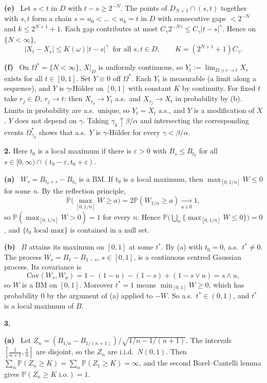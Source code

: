 \documentclass[11pt,a4paper]{article}
\renewcommand{\P}{\mathbb{P}}
\newcommand{\1}{\mathbf{1}}
\newcommand{\prob}[1]{\par\medskip\noindent\textbf{#1}\quad}
\newcommand{\sub}[1]{\par\smallskip\noindent\textbf{#1}\ }
\begin{document}
\sub{(e)} Let $s<t$ in $D$ with $t-s\ge2^{-N}$. The points of $D_{N+1}\cap(s,t)$ together with $s,t$
form a chain $s=u_0<\dots<u_k=t$ in $D$ with consecutive gaps $<2^{-N}$ and $k\le2^{N+1}+1$.
Each gap contributes at most $C_\gamma2^{-N\gamma}\le C_\gamma|t-s|^\gamma$. Hence on $\{N<\infty\}$,
\[|X_t-X_s|\le K(\omega)|t-s|^\gamma\ \text{ for all } s,t\in D,\qquad K=(2^{N+1}+1)C_\gamma.\]

\sub{(f)} On $\Omega^*=\{N<\infty\}$, $X|_D$ is uniformly continuous, so
$Y_t:=\lim_{D\ni r\to t}X_r$ exists for all $t\in[0,1]$. Set $Y\equiv0$ off $\Omega^*$. Each $Y_t$ is
measurable (a limit along a sequence), and $Y$ is $\gamma$-H\"older on $[0,1]$ with constant $K$ by
continuity. For fixed $t$ take $r_j\in D$, $r_j\to t$: then $X_{r_j}\to Y_t$ a.s.\ and
$X_{r_j}\to X_t$ in probability by (b). Limits in probability are a.s.\ unique, so $Y_t=X_t$ a.s.,
and $Y$ is a modification of $X$. $Y$ does not depend on $\gamma$. Taking $\gamma_k\uparrow\beta/\alpha$
and intersecting the corresponding events $\Omega^*_{\gamma_k}$ shows that a.s.\ $Y$ is $\gamma$-H\"older for every
$\gamma<\beta/\alpha$.

\prob{2.}
Here $t_0$ is a local maximum if there is $\varepsilon>0$ with $B_s\le B_{t_0}$ for all
$s\in[0,\infty)\cap(t_0-\varepsilon,t_0+\varepsilon)$.

\sub{(a)} $W_s=B_{t_0+s}-B_{t_0}$ is a BM. If $t_0$ is a local maximum, then $\max_{[0,1/n]}W\le0$ for some $n$.
By the reflection principle,
\[\P\big(\max_{[0,1/n]}W\ge a\big)=2\P(W_{1/n}\ge a)\xrightarrow[a\downarrow0]{}1,\]
so $\P(\max_{[0,1/n]}W>0)=1$ for every $n$. Hence
$\P\big(\bigcup_n\{\max_{[0,1/n]}W\le0\}\big)=0$, and $\{t_0\text{ local max}\}$ is contained in a null set.

\sub{(b)} $B$ attains its maximum on $[0,1]$ at some $t^*$. By (a) with $t_0=0$, a.s.\ $t^*\neq0$. The process
$W_s=B_1-B_{1-s}$, $s\in[0,1]$, is a continuous centred Gaussian process. Its covariance is
\[
\mathrm{Cov}(W_s,W_u)=1-(1-u)-(1-s)+(1-s\vee u)=s\wedge u,
\]
so $W$ is a BM on $[0,1]$. Moreover $t^*=1$ means $\min_{[0,1]}W\ge0$, which has probability $0$ by the argument of (a)
applied to $-W$. So a.s.\ $t^*\in(0,1)$, and $t^*$ is a local maximum of $B$.

\prob{3.}
\sub{(a)} Let $Z_n=(B_{1/n}-B_{1/(n+1)})/\sqrt{1/n-1/(n+1)}$. The intervals $[\frac1{n+1},\frac1n]$ are
disjoint, so the $Z_n$ are i.i.d.\ $N(0,1)$. Then $\sum_n\P(Z_n\ge K)=\sum_n\P(Z_1\ge K)=\infty$, and the second Borel--Cantelli
lemma gives $\P(Z_n\ge K\text{ i.o.})=1$.
\end{document}
